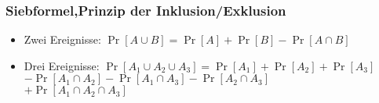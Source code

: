 \subsubsection{Siebformel,Prinzip der Inklusion/Exklusion}
\begin{itemize}
\item Zwei Ereignisse: $\Pr[A\cup B]=\Pr[A]+\Pr[B]-\Pr[A\cap B]$
\item Drei Ereignisse: $\Pr[A_1\cup A_2\cup A_3]=\Pr[A_1]+\Pr[A_2]+\Pr[A_3]$\\
				$-\Pr[A_1\cap A_2]-\Pr[A_1\cap A_3]-\Pr[A_2\cap A_3]$\\
				$+\Pr[A_1\cap A_2\cap A_3]$
\end{itemize}